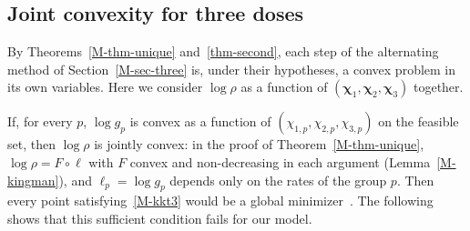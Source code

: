\subsection{Joint convexity for three doses}\label{app-joint}

By Theorems~\ref{M-thm-unique} and~\ref{thm-second}, each step of the
alternating method of Section~\ref{M-sec-three} is, under their hypotheses, a
convex problem in its own variables. Here we consider $\log\rho$ as a function
of $(\bm\chi_1,\bm\chi_2,\bm\chi_3)$ together.

If, for every $p$, $\log g_p$ is convex as a function of
$(\chi_{1,p},\chi_{2,p},\chi_{3,p})$ on the feasible set, then $\log\rho$ is
jointly convex: in the proof of Theorem~\ref{M-thm-unique},
$\log\rho=F\circ\bm\ell$ with $F$ convex and non-decreasing in each argument
(Lemma~\ref{M-kingman}), and $\ell_p=\log g_p$ depends only on the rates of the
group $p$. Then every point satisfying~\eqref{M-kkt3} would be a global
minimizer~\cite[Section~5.5.3]{2004Boyd_Vandenberghe}. The following shows that
this sufficient condition fails for our model.

